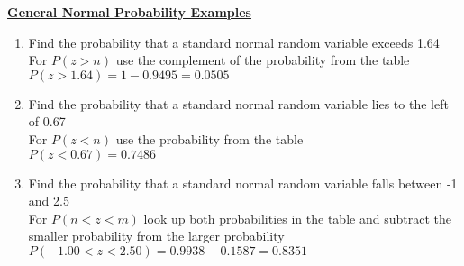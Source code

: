 \documentclass[a4paper]{article}
\let\bf\textbf
\begin{document}
\begin{shaded}
    \underline{\bf{General Normal Probability Examples}}
    \begin{enumerate}
        \item Find the probability that a standard normal random variable exceeds 1.64
        \vspace{1mm}\\
        For $P(z > n)$ use the complement of the probability from the table\\
        $P(z > 1.64) = 1 - 0.9495 = 0.0505$
        \item Find the probability that a standard normal random variable lies to the left of 0.67
        \vspace{1mm}\\
        For $P(z < n)$ use the probability from the table\\
        $P(z < 0.67) = 0.7486$
        \item Find the probability that a standard normal random variable falls between -1 and 2.5
        \vspace{1mm}\\
        For $P(n < z < m)$ look up both probabilities in the table and subtract the smaller probability from the larger probability\\
        $P(-1.00 < z < 2.50) = 0.9938 - 0.1587 = 0.8351$
    \end{enumerate}
\end{shaded}
\end{document}
